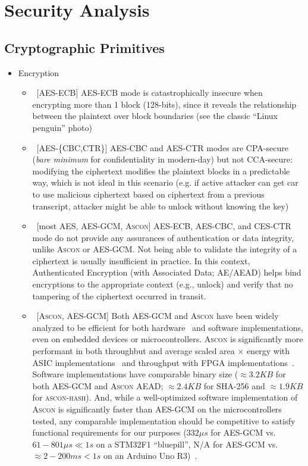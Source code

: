 \section{Security Analysis}
\label{sec:security-analysis}



\subsection{Cryptographic Primitives}

\begin{itemize}
    \item Encryption
    \begin{itemize}
        \item\ [\xmark\xmark\xmark AES-ECB] AES-ECB mode is catastrophically insecure when encrypting more than 1 block (128-bits), since it reveals the relationship between the plaintext over block boundaries (see the classic ``Linux penguin'' photo)
        \item\ [\xmark AES-\{CBC,CTR\}] AES-CBC and AES-CTR modes are CPA-secure (\emph{bare minimum} for confidentiality in modern-day) but not CCA-secure: modifying the ciphertext modifies the plaintext blocks in a predictable way, which is not ideal in this scenario (e.g. if active attacker can get car to use malicious ciphertext based on ciphertext from a previous transcript, attacker might be able to unlock without knowing the key)
        \item\ [\xmark most AES, \cmark AES-GCM, \cmark A\textsc{scon}] AES-ECB, AES-CBC, and CES-CTR mode do not provide any assurances of authentication or data integrity, unlike A\textsc{scon} or AES-GCM. Not being able to validate the integrity of a ciphertext is usually insufficient in practice. In this context, Authenticated Encryption (with Associated Data; AE/AEAD) helps bind encryptions to the appropriate context (e.g., unlock) and verify that no tampering of the ciphertext occurred in transit.
        \item\ [\cmark\cmark A\textsc{scon}, \cmark AES-GCM] Both AES-GCM and A\textsc{scon} have been widely analyzed to be efficient for both hardware~\cite{EPRINT:AagZid21} and software implementations, even on embedded devices or microcontrollers. A\textsc{scon} is significantly more performant in both throughbut and average scaled area $\times$ energy with ASIC implementations~\cite{EPRINT:AagZid21} and throughput with FPGA implementations~\cite{EPRINT:MHNFAKG20}. Software implementations have comparable binary size ($\approx 3.2 KB$ for both AES-GCM and A\textsc{scon} AEAD; $\approx 2.4 KB$ for SHA-256 and $\approx 1.9 KB$ for \textsc{ascon-hash}). And, while a well-optimized software implementation of A\textsc{scon} is significantly faster than AES-GCM on the microcontrollers tested, any comparable implementation should be competitive to satisfy functional requirements for our purposes ($332 {\mu}s$ for AES-GCM vs. $61-801 {\mu}s \ll 1 s$ on a STM32F1 ``bluepill'', N/A for AES-GCM vs. $\approx 2-200 ms < 1 s$ on an Arduino Uno R3)~\cite{lwc-sw-benches}.

\end{itemize}
\end{itemize}

